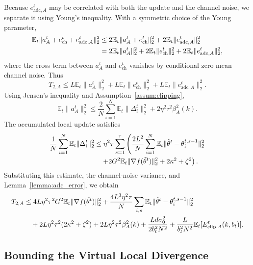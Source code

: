 \documentclass[conference]{IEEEtran}
\begin{document}
Because $e_{\mathrm{adc},A}^t$ may be correlated with both the update and the channel noise, we separate it using Young's inequality. With a symmetric choice of the Young parameter,
\begin{align}
    \mathbb{E}_t\|a_A^t+e_{\mathrm{ch}}^t+e_{\mathrm{adc},A}^t\|_2^2
    &\le
    2\mathbb{E}_t\|a_A^t+e_{\mathrm{ch}}^t\|_2^2
    +2\mathbb{E}_t\|e_{\mathrm{adc},A}^t\|_2^2
    \notag\\
    &=2\mathbb{E}_t\|a_A^t\|_2^2
    +2\mathbb{E}_t\|e_{\mathrm{ch}}^t\|_2^2
    +2\mathbb{E}_t\|e_{\mathrm{adc},A}^t\|_2^2,
\end{align}
where the cross term between $a_A^t$ and $e_{\mathrm{ch}}^t$ vanishes by conditional zero-mean channel noise. Thus
\begin{equation}
    T_{2,A}
    \le
    L\mathbb{E}_t\|a_A^t\|_2^2
    +L\mathbb{E}_t\|e_{\mathrm{ch}}^t\|_2^2
    +L\mathbb{E}_t\|e_{\mathrm{adc},A}^t\|_2^2.
\end{equation}
Using Jensen's inequality and Assumption~\ref{assum:clipping},
\begin{equation}
    \mathbb{E}_t\|a_A^t\|_2^2
    \le
    \frac{2}{N}\sum_{i=1}^{N}\mathbb{E}_t\|\Delta_i^t\|_2^2
    +2\eta^2\tau^2\beta_A^2(k).
\end{equation}
The accumulated local update satisfies
\begin{align}
    \frac1N\sum_{i=1}^{N}\mathbb{E}_t\|\Delta_i^t\|_2^2
    &\le
    \eta^2\tau\sum_{s=1}^{\tau}
    \left(
    \frac{2L^2}{N}\sum_{i=1}^{N}\mathbb{E}_t\|\tilde\theta^t-\theta_i^{t,s-1}\|_2^2
    \right.
    \notag\\
    &\quad\left.
    +2G^2\mathbb{E}_t\|\nabla f(\tilde\theta^t)\|_2^2
    +2\kappa^2+\zeta^2
    \right).
\end{align}
Substituting this estimate, the channel-noise variance, and Lemma~\ref{lemma:adc_error}, we obtain
\begin{align}
    \label{eqn:t2_bound_new}
    T_{2,A}
    &\le
    4L\eta^2\tau^2G^2\mathbb{E}_t\|\nabla f(\tilde\theta^t)\|_2^2
    +\frac{4L^3\eta^2\tau}{N}\sum_{i,s}\mathbb{E}_t\|\tilde\theta^t-\theta_i^{t,s-1}\|_2^2
    \notag\\
    &\quad+
    2L\eta^2\tau^2(2\kappa^2+\zeta^2)
    +2L\eta^2\tau^2\beta_A^2(k)
    +\frac{Ld\sigma_0^2}{2b_t^2N^2}
    +\frac{L}{b_t^2N^2}\mathbb{E}_t[E_{\mathrm{clip},A}^t(k,b_t)].
\end{align}

\subsection{Bounding the Virtual Local Divergence}
\end{document}
